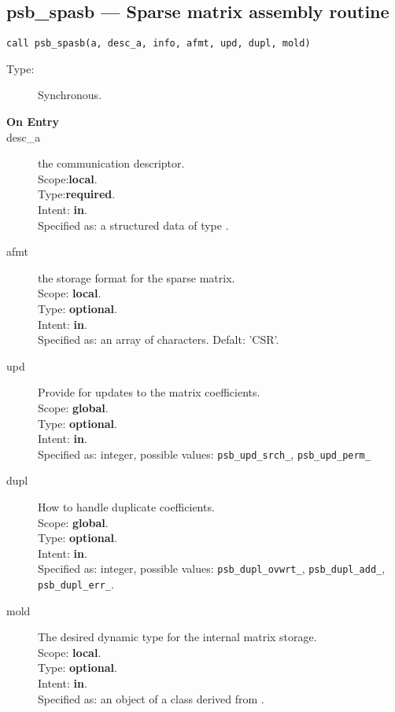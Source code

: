 %
%
\clearpage\subsection*{psb\_spasb --- Sparse matrix assembly routine}

\begin{verbatim}
call psb_spasb(a, desc_a, info, afmt, upd, dupl, mold)
\end{verbatim}

\begin{description}
\item[Type:] Synchronous.
\item[\bf On Entry]
\item[desc\_a] the communication descriptor.\\
Scope:{\bf local}.\\
Type:{\bf required}.\\
Intent: {\bf in}.\\
Specified as: a structured data of type \descdata.
\item[afmt] the storage format for the sparse matrix.\\
Scope: {\bf local}.\\
Type: {\bf optional}.\\
Intent: {\bf in}.\\
Specified as: an array of characters. Defalt:  'CSR'.
\item[upd] Provide for updates to the matrix coefficients.\\
Scope: {\bf global}.\\
Type: {\bf optional}.\\
Intent: {\bf in}.\\
Specified as: integer, possible values: \verb|psb_upd_srch_|, \verb|psb_upd_perm_|
\item[dupl] How to handle duplicate coefficients.\\
Scope: {\bf global}.\\
Type: {\bf optional}.\\
Intent: {\bf in}.\\
Specified as: integer, possible values: \verb|psb_dupl_ovwrt_|,
\verb|psb_dupl_add_|, \verb|psb_dupl_err_|.
\item[mold] The desired dynamic type for the internal matrix storage.\\
Scope: {\bf local}.\\
Type: {\bf optional}.\\
Intent: {\bf in}.\\
Specified as: an object of a class derived from \spbasedata. 
\end{description}

